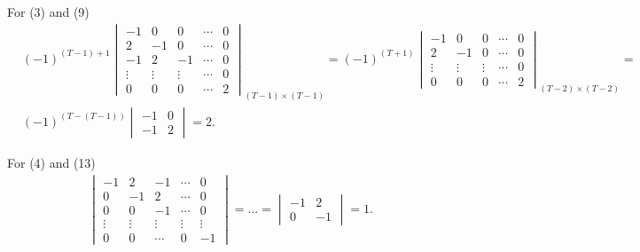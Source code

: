 \documentclass[12pt,a4paper,hyperref]{article}
\begin{document}
For (3) and (9)
\begin{align*}
& (-1)^{(T-1)+1}
\begin{vmatrix}
-1      & 0      & 0     & \cdots & 0 \\
 2      & -1     &0      & \cdots & 0 \\
 -1      & 2      &-1      & \cdots & 0 \\
 \vdots & \vdots & \vdots & \cdots & 0 \\
0       & 0      & 0      & \cdots & 2
\end{vmatrix}
_{(T-1) \times (T-1)}
=(-1)^{(T+1)}
\begin{vmatrix}
-1      & 0      & 0       & \cdots & 0 \\
2       &-1      &   0     & \cdots & 0 \\
 \vdots & \vdots &  \vdots & \cdots & 0\\
 0      & 0      &  0      &\cdots & 2
\end{vmatrix}
_{(T-2) \times (T-2)}
=  \\ &
(-1)^{(T-(T-1))}
\begin{vmatrix}
-1 & 0  \\
-1 &  2
\end{vmatrix}
= 2.
\end{align*}


For (4) and (13)
\begin{align*}
\begin{vmatrix}
-1      & 2      & -1      &     \cdots    &0 \\
   0    & -1     & 2      &     \cdots    &0 \\
    0   & 0      & -1       &    \cdots     & 0 \\
 \vdots & \vdots & \vdots  & \vdots  & \vdots\\
    0   &  0     &  \cdots & 0     & -1
\end{vmatrix}=
...=
\begin{vmatrix}
-1 & 2 \\
0 & -1
\end{vmatrix}
=1.
\end{align*}
\end{document}
